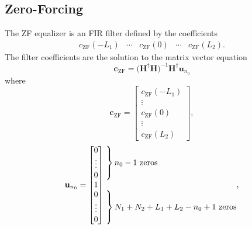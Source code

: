 \subsection{Zero-Forcing}
The ZF equalizer is an FIR filter defined by the coefficients
\begin{equation}
\begin{matrix}
c_\text{ZF}(-L_1) & \cdots & c_\text{ZF}(0) & \cdots & c_\text{ZF}(L_2).
\end{matrix}
\end{equation}
The filter coefficients are the solution to the matrix vector equation \cite[eq. (311)]{PAQ-phase1}
\begin{equation}
\mathbf{c}_\text{ZF} = \big(\mathbf{H}^\dagger\mathbf{H}\big)^{-1} \mathbf{H}^\dagger \mathbf{u}_{n_0}
\label{eq:c_ZF_direct}
\end{equation}
where
\begin{equation}
\mathbf{c}_\text{ZF} = 
\begin{bmatrix}
c_\text{ZF}(-L_1) \\ \vdots \\ c_\text{ZF}(0) \\ \vdots \\ c_\text{ZF}(L_2)
\end{bmatrix},
\end{equation}
\begin{equation}
\mathbf{u}_{n_0} = \begin{bmatrix} 0 \\ \vdots \\ 0 \\ 1 \\ 0 \\ \vdots \\ 0 \end{bmatrix}
	\begin{matrix*}[l] \left. \vphantom{\begin{matrix} 0 \\ \vdots \\ 0 \end{matrix}} \right\}
		\text{$n_0-1$ zeros}
		\\ \\
		\left. \vphantom{\begin{matrix} 0 \\ \vdots \\ 0 \end{matrix}} \right\}
		\text{$N_1+N_2+L_1+L_2-n_0+1$ zeros}
		\end{matrix*},
		\label{eq:un0_ZF}
\end{equation}
